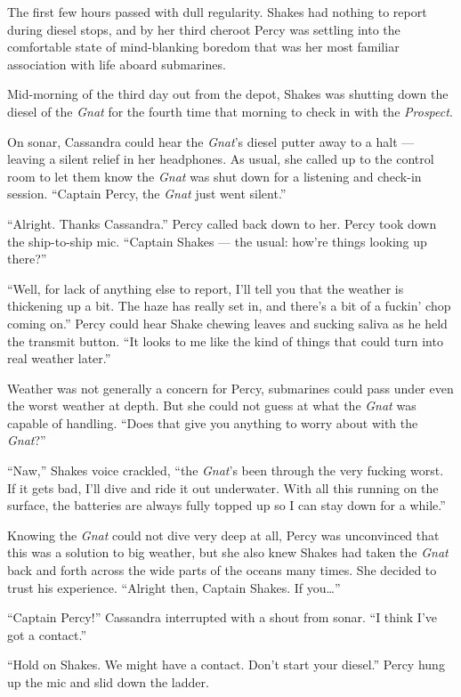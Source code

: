 \documentclass[
]{scrbook}
\begin{document}
The first few hours passed with dull regularity. Shakes had nothing to
report during diesel stops, and by her third cheroot Percy was settling
into the comfortable state of mind-blanking boredom that was her most
familiar association with life aboard submarines.

Mid-morning of the third day out from the depot, Shakes was shutting
down the diesel of the \emph{Gnat} for the fourth time that morning to
check in with the \emph{Prospect}.

On sonar, Cassandra could hear the \emph{Gnat}'s diesel putter away to a
halt --- leaving a silent relief in her headphones. As usual, she called
up to the control room to let them know the \emph{Gnat} was shut down
for a listening and check-in session. ``Captain Percy, the \emph{Gnat}
just went silent.''

``Alright. Thanks Cassandra.'' Percy called back down to her. Percy took
down the ship-to-ship mic. ``Captain Shakes --- the usual: how're things
looking up there?''

``Well, for lack of anything else to report, I'll tell you that the
weather is thickening up a bit. The haze has really set in, and there's
a bit of a fuckin' chop coming on.'' Percy could hear Shake chewing
leaves and sucking saliva as he held the transmit button. ``It looks to
me like the kind of things that could turn into real weather later.''

Weather was not generally a concern for Percy, submarines could pass
under even the worst weather at depth. But she could not guess at what
the \emph{Gnat} was capable of handling. ``Does that give you anything
to worry about with the \emph{Gnat}?''

``Naw,'' Shakes voice crackled, ``the \emph{Gnat}'s been through the
very fucking worst. If it gets bad, I'll dive and ride it out
underwater. With all this running on the surface, the batteries are
always fully topped up so I can stay down for a while.''

Knowing the \emph{Gnat} could not dive very deep at all, Percy was
unconvinced that this was a solution to big weather, but she also knew
Shakes had taken the \emph{Gnat} back and forth across the wide parts of
the oceans many times. She decided to trust his experience. ``Alright
then, Captain Shakes. If you\ldots{}''

``Captain Percy!'' Cassandra interrupted with a shout from sonar. ``I
think I've got a contact.''

``Hold on Shakes. We might have a contact. Don't start your diesel.''
Percy hung up the mic and slid down the ladder.
\end{document}
